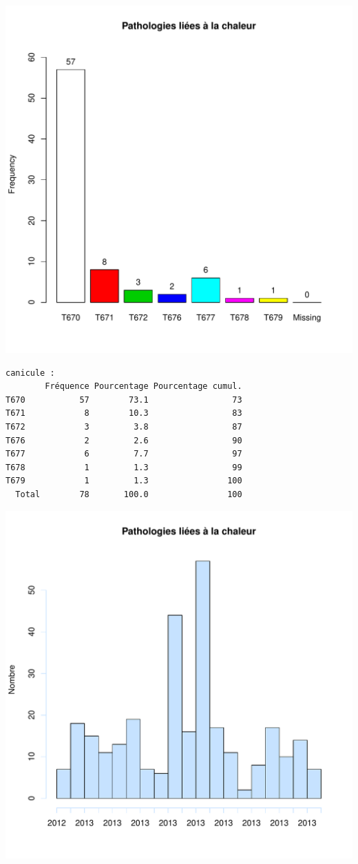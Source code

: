 \documentclass[12pt,english,french,twoside]{book}\usepackage[]{graphicx}\usepackage[]{color}
\makeatletter
\def\maxwidth{ %
  \ifdim\Gin@nat@width>\linewidth
    \linewidth
  \else
    \Gin@nat@width
  \fi
}
\newenvironment{kframe}{%
 \def\at@end@of@kframe{}%
 \ifinner\ifhmode%
  \def\at@end@of@kframe{\end{minipage}}%
  \begin{minipage}{\columnwidth}%
 \fi\fi%
 \def\FrameCommand##1{\hskip\@totalleftmargin \hskip-\fboxsep
 \colorbox{shadecolor}{##1}\hskip-\fboxsep
     \hskip-\linewidth \hskip-\@totalleftmargin \hskip\columnwidth}%
 \MakeFramed {\advance\hsize-\width
   \@totalleftmargin\z@ \linewidth\hsize
   \@setminipage}}%
 {\par\unskip\endMakeFramed%
 \at@end@of@kframe}
\newenvironment{knitrout}{}{} %
\makeatother
\begin{document}
\begin{knitrout}
\includegraphics[width=\maxwidth]{figure/canicule-2} 
\begin{kframe}\begin{verbatim}
canicule : 
        Fréquence Pourcentage Pourcentage cumul.
T670           57        73.1                 73
T671            8        10.3                 83
T672            3         3.8                 87
T676            2         2.6                 90
T677            6         7.7                 97
T678            1         1.3                 99
T679            1         1.3                100
  Total        78       100.0                100
\end{verbatim}
\end{kframe}
\includegraphics[width=\maxwidth]{figure/canicule-3} 

\end{knitrout}
\end{document}
